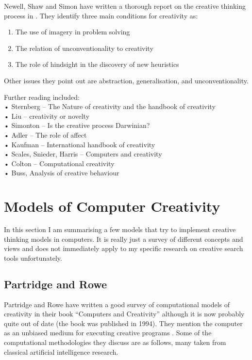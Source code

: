 Newell, Shaw and Simon have written a thorough report on the creative thinking process in \citep{Newell1963}. They identify three main conditions for creativity as:

\begin{enumerate}
  \item The use of imagery in problem solving
  \item The relation of unconventionality to creativity
  \item The role of hindsight in the discovery of new heuristics
\end{enumerate}

Other issues they point out are abstraction, generalisation, and unconventionality.

Further reading included:\\
•	Sternberg – The Nature of creativity and the handbook of creativity \citep{Sternberg1999, Sternberg1999}\\
•	Liu – creativity or novelty \citep{Liu2000}\\
•	Simonton – Is the creative process Darwinian? \citep{Simonton2011}\\
•	Adler – The role of affect \citep{Adler2007}\\
•	Kaufman – International handbook of creativity \citep{Kaufman2006}\\
•	Scales, Snieder, Harris – Computers and creativity \citep{Scales1999}\\
•	Colton – Computational creativity \citep{Colton2008}\\
•	Buss, Analysis of creative behaviour \citep{Buss2011, Zedan2008}


\section{Models of Computer Creativity}

In this section I am summarising a few models that try to implement creative thinking models in computers. It is really just a survey of different concepts and views and does not immediately apply to my specific research on creative search tools unfortunately.

\subsection{Partridge and Rowe}

Partridge and Rowe have written a good survey of computational models of creativity in their book ``Computers and Creativity'' \citep{Partridge1994} although it is now probably quite out of date (the book was published in 1994). They mention the computer as an unbiased medium for executing creative programs \citep[p.26]{Partridge1994}. Some of the computational methodologies they discuss are as follows, many taken from classical artificial intelligence research.

